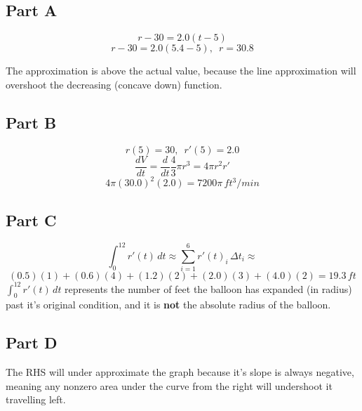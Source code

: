\subsection{Part A}
\[ r - 30 = 2.0(t - 5) \]
\[ r - 30 = 2.0(5.4 - 5), \enspace r = 30.8 \]
\begin{center}
\end{center}
The approximation is above the actual value, because the line approximation will overshoot the decreasing (concave down) function.

\subsection{Part B}
\[ r(5) = 30, \enspace r'(5) = 2.0 \]
\[ \frac{dV}{dt} = \frac{d}{dt} \frac{4}{3}\pi r^3 = 4 \pi r^2 r' \]
\[ 4 \pi (30.0)^2(2.0) = 7200\pi \, ft^3/min \]

\subsection{Part C}
\[ \int_{0}^{12} r'(t)\,dt \approx \sum _{i=1}^{6}r'(t)_{i}\,\Delta t_{i} \approx \]
\[ (0.5)(1) + (0.6)(4) + (1.2)(2) + (2.0)(3) + (4.0)(2) = 19.3 \, ft\]
\underline{$\int_{0}^{12} r'(t)\,dt$} represents the number of feet the balloon has expanded (in radius) past it's original condition, and it is \textbf{not} the absolute radius of the balloon.

\subsection{Part D}
\begin{center}
\end{center}

The RHS will under approximate the graph because it's slope is always negative, meaning any nonzero area under the curve from the right will undershoot it travelling left.
